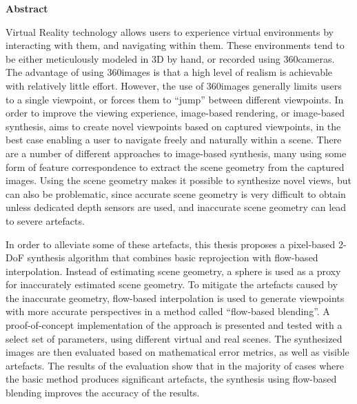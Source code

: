 \vspace*{2cm}

\begin{center}
    \textbf{Abstract}
\end{center}

\vspace*{1cm}

\noindent 
Virtual Reality technology allows users to experience virtual environments by interacting with them, and navigating within them. These environments tend to be either meticulously modeled in 3D by hand, or recorded using 360\degree cameras. The advantage of using 360\degree images is that a high level of realism is achievable with relatively little effort. However, the use of 360\degree images generally limits users to a single viewpoint, or forces them to ``jump'' between different viewpoints.
In order to improve the viewing experience,
image-based rendering, or image-based synthesis, aims to create novel viewpoints based on captured viewpoints, in the best case enabling a user to navigate freely and naturally within a scene.
There are a number of different approaches to image-based synthesis, many using some form of feature correspondence to extract
 the scene geometry from the captured images.
Using the scene geometry makes it possible to synthesize novel views, but can also be problematic, since accurate scene geometry is very difficult to obtain unless dedicated depth sensors are used, and inaccurate scene geometry can lead to severe artefacts.

In order to alleviate some of these artefacts,
this thesis proposes a pixel-based 2-DoF synthesis algorithm that combines basic reprojection with flow-based interpolation.
Instead of estimating scene geometry, a sphere is used as a proxy for inaccurately estimated scene geometry.
To mitigate the artefacts caused by the inaccurate geometry, flow-based interpolation is used to generate viewpoints with more accurate perspectives in a method called ``flow-based blending''.
A proof-of-concept implementation of the approach is presented and tested with a select set of parameters, using different virtual and real scenes.
The synthesized images are then evaluated based on mathematical error metrics, as well as visible artefacts. The results of the evaluation show that in the majority of cases where the basic method produces significant artefacts, the synthesis using flow-based blending improves the accuracy of the results.


